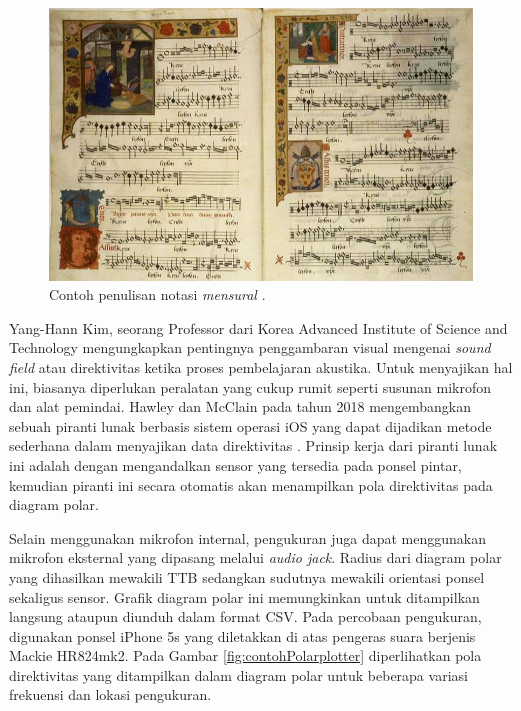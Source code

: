 \begin{figure}[b!]
    \centering
    \includegraphics[width=13.5cm]{Gambar/1015px-Barbireau_illum.jpg}
    \caption{Contoh penulisan notasi \textit{mensural} \cite{WQXR}.}
    \label{fig:notasimensural}
\end{figure}
Yang-Hann Kim, seorang Professor dari Korea Advanced Institute of Science and Technology mengungkapkan pentingnya penggambaran visual mengenai \textit{sound field} atau direktivitas ketika proses pembelajaran akustika. Untuk menyajikan hal ini, biasanya diperlukan peralatan yang cukup rumit seperti susunan mikrofon dan alat pemindai. Hawley dan McClain pada tahun 2018 mengembangkan sebuah piranti lunak berbasis sistem operasi iOS yang dapat dijadikan metode sederhana dalam menyajikan data direktivitas \cite{PakeHP}. Prinsip kerja dari piranti lunak ini adalah dengan mengandalkan sensor yang tersedia pada ponsel pintar, kemudian piranti ini secara otomatis akan menampilkan pola direktivitas pada diagram polar.  \par 
Selain menggunakan mikrofon internal, pengukuran juga dapat menggunakan mikrofon eksternal yang dipasang melalui \textit{audio jack}. Radius dari diagram polar yang dihasilkan mewakili TTB sedangkan sudutnya mewakili orientasi ponsel sekaligus sensor. Grafik diagram polar ini memungkinkan untuk ditampilkan langsung ataupun diunduh dalam format CSV. Pada percobaan pengukuran, digunakan ponsel iPhone 5s yang diletakkan di atas pengeras suara berjenis Mackie HR824mk2. Pada Gambar \ref{fig:contohPolarplotter} diperlihatkan pola direktivitas yang ditampilkan dalam diagram polar untuk beberapa variasi frekuensi dan lokasi pengukuran. \par

